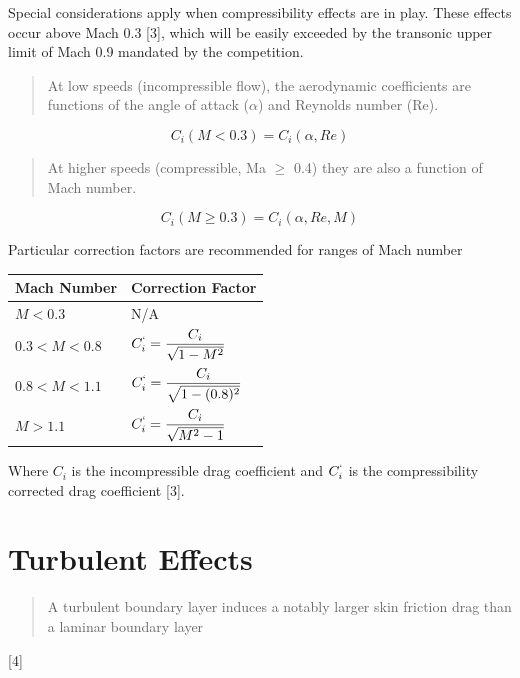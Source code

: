 \documentclass[]{book}
\begin{document}
Special considerations apply when compressibility effects are in play.
These effects occur above Mach 0.3 {[}3{]}, which will be easily
exceeded by the transonic upper limit of Mach 0.9 mandated by the
competition.

\begin{quote}
At low speeds (incompressible flow), the aerodynamic coefficients are
functions of the angle of attack (\(\alpha\)) and Reynolds number (Re).
\end{quote}

\begin{equation}
C_i (M < 0.3) = C_i (\alpha, Re) 
\end{equation}

\begin{quote}
At higher speeds (compressible, Ma \(\ge\) 0.4) they are also a function
of Mach number.
\end{quote}

\begin{equation}
C_i (M \ge 0.3) = C_i (\alpha, Re, M)
\end{equation}

Particular correction factors are recommended for ranges of Mach number

\begin{longtable}[c]{@{}ll@{}}
\toprule
Mach Number & Correction Factor\tabularnewline
\midrule
\endhead
\( M < 0.3 \) & N/A\tabularnewline
\( 0.3 < M < 0.8 \) &
\( C^`_i = \dfrac{C_i}{\sqrt{1-M^2}} \)\tabularnewline
\( 0.8 < M < 1.1 \) &
\( C^`_i = \dfrac{C_i}{\sqrt{1-(0.8)^2}} \)\tabularnewline
\( M > 1.1 \) & \( C^`_i = \dfrac{C_i}{\sqrt{M^2-1}} \)\tabularnewline
\bottomrule
\end{longtable}


Where \(C_i\) is the incompressible drag coefficient and \(C^`_i\) is
the compressibility corrected drag coefficient {[}3{]}.

\section{Turbulent Effects}\label{turbulent-effects}

\begin{quote}
A turbulent boundary layer induces a notably larger skin friction drag
than a laminar boundary layer
\end{quote}

{[}4{]}
\end{document}
